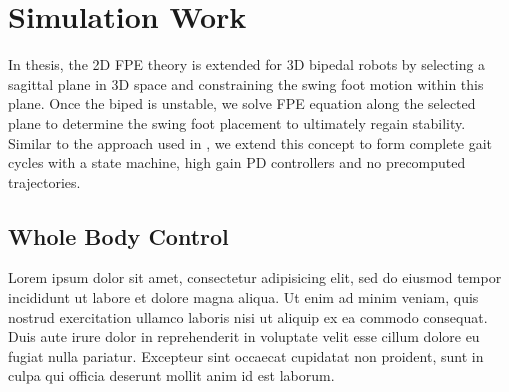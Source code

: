 \chapter{Simulation Work} %
\label{cha:simulations}
In thesis, the 2D FPE theory is extended for 3D bipedal robots by selecting a sagittal plane in 3D space and constraining the swing foot motion within this plane. Once the biped is unstable, we solve FPE equation along the selected plane to determine the swing foot placement to ultimately regain stability. Similar to the approach used in \cite{Wight:2008ii,Wight:2008vt}, we extend this concept to form complete gait cycles with a state machine, high gain PD controllers and no precomputed trajectories.


\section{Whole Body Control} %
\label{sec:whole_body_control}
Lorem ipsum dolor sit amet, consectetur adipisicing elit, sed do eiusmod
tempor incididunt ut labore et dolore magna aliqua. Ut enim ad minim veniam,
quis nostrud exercitation ullamco laboris nisi ut aliquip ex ea commodo
consequat. Duis aute irure dolor in reprehenderit in voluptate velit esse
cillum dolore eu fugiat nulla pariatur. Excepteur sint occaecat cupidatat non
proident, sunt in culpa qui officia deserunt mollit anim id est laborum.

